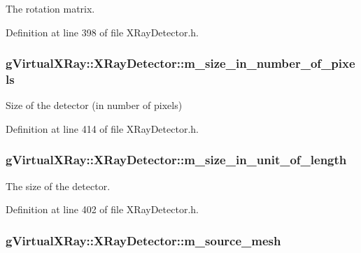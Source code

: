 The rotation matrix. 



Definition at line 398 of file XRayDetector.h.

\hypertarget{classg_virtual_x_ray_1_1_x_ray_detector_a07c8671a6c02fb8b99e4b7c5d23cb8cf}{
\subsubsection[{m\_\-size\_\-in\_\-number\_\-of\_\-pixels}]{ {\bf gVirtualXRay::XRayDetector::m\_\-size\_\-in\_\-number\_\-of\_\-pixels}}}
\label{classg_virtual_x_ray_1_1_x_ray_detector_a07c8671a6c02fb8b99e4b7c5d23cb8cf}


Size of the detector (in number of pixels) 



Definition at line 414 of file XRayDetector.h.

\hypertarget{classg_virtual_x_ray_1_1_x_ray_detector_a742613089e3a523792c5b253020d7d98}{
\subsubsection[{m\_\-size\_\-in\_\-unit\_\-of\_\-length}]{ {\bf gVirtualXRay::XRayDetector::m\_\-size\_\-in\_\-unit\_\-of\_\-length}}}
\label{classg_virtual_x_ray_1_1_x_ray_detector_a742613089e3a523792c5b253020d7d98}


The size of the detector. 



Definition at line 402 of file XRayDetector.h.

\hypertarget{classg_virtual_x_ray_1_1_x_ray_detector_a3c61d804f04b81a2aeab9afa09a2644d}{
\subsubsection[{m\_\-source\_\-mesh}]{ {\bf gVirtualXRay::XRayDetector::m\_\-source\_\-mesh}}}
\label{classg_virtual_x_ray_1_1_x_ray_detector_a3c61d804f04b81a2aeab9afa09a2644d}


